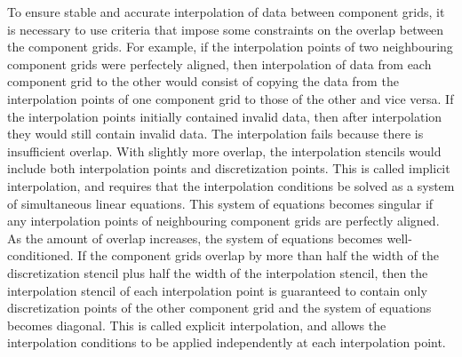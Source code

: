 \documentclass{article}
\begin{document}
To ensure stable and accurate interpolation of data between component grids, it is necessary to use criteria that impose some constraints on the
overlap between the component grids.  For example, if the interpolation points of two neighbouring component grids were perfectely aligned, then
interpolation of data from each component grid to the other would consist of copying the data from the interpolation points of one component grid
to those of the other and vice versa.  If the interpolation points initially contained invalid data, then after interpolation they would still
contain invalid data.  The interpolation fails because there is insufficient overlap.  With slightly more overlap, the interpolation stencils
would include both interpolation points and discretization points.  This is called implicit interpolation, and requires that the interpolation
conditions be solved as a system of simultaneous linear equations.  This system of equations becomes singular if any interpolation points of
neighbouring component grids are perfectly aligned. As the amount of overlap increases, the system of equations becomes well-conditioned.  If the
component grids overlap by more than half the width of the discretization stencil plus half the width of the interpolation stencil, then the
interpolation stencil of each interpolation point is guaranteed to contain only discretization points of the other component grid and the system
of equations becomes diagonal.  This is called explicit interpolation, and allows the interpolation conditions to be applied independently at
each interpolation point.
\end{document}

